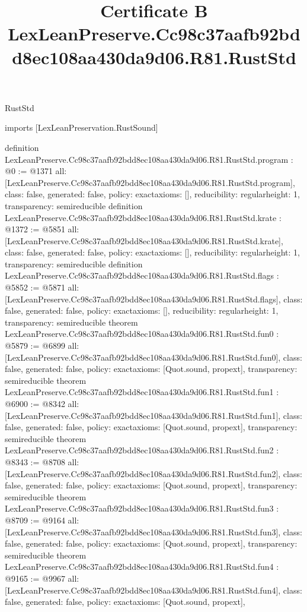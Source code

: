 \begin{lexlean}{RustStd}
\title{Certificate B LexLeanPreserve.Cc98c37aafb92bdd8ec108aa430da9d06.R81.RustStd}
\begin{coremodule}
imports [LexLeanPreservation.RustSound]

definition LexLeanPreserve.Cc98c37aafb92bdd8ec108aa430da9d06.R81.RustStd.program : @0 := @1371 {
  all: [LexLeanPreserve.Cc98c37aafb92bdd8ec108aa430da9d06.R81.RustStd.program],
  class: false,
  generated: false,
  policy: exact{axioms: []},
  reducibility: regular{height: 1},
  transparency: semireducible
}
definition LexLeanPreserve.Cc98c37aafb92bdd8ec108aa430da9d06.R81.RustStd.krate : @1372 := @5851 {
  all: [LexLeanPreserve.Cc98c37aafb92bdd8ec108aa430da9d06.R81.RustStd.krate],
  class: false,
  generated: false,
  policy: exact{axioms: []},
  reducibility: regular{height: 1},
  transparency: semireducible
}
definition LexLeanPreserve.Cc98c37aafb92bdd8ec108aa430da9d06.R81.RustStd.flags : @5852 := @5871 {
  all: [LexLeanPreserve.Cc98c37aafb92bdd8ec108aa430da9d06.R81.RustStd.flags],
  class: false,
  generated: false,
  policy: exact{axioms: []},
  reducibility: regular{height: 1},
  transparency: semireducible
}
theorem LexLeanPreserve.Cc98c37aafb92bdd8ec108aa430da9d06.R81.RustStd.fun0 : @5879 := @6899 {
  all: [LexLeanPreserve.Cc98c37aafb92bdd8ec108aa430da9d06.R81.RustStd.fun0],
  class: false,
  generated: false,
  policy: exact{axioms: [Quot.sound, propext]},
  transparency: semireducible
}
theorem LexLeanPreserve.Cc98c37aafb92bdd8ec108aa430da9d06.R81.RustStd.fun1 : @6900 := @8342 {
  all: [LexLeanPreserve.Cc98c37aafb92bdd8ec108aa430da9d06.R81.RustStd.fun1],
  class: false,
  generated: false,
  policy: exact{axioms: [Quot.sound, propext]},
  transparency: semireducible
}
theorem LexLeanPreserve.Cc98c37aafb92bdd8ec108aa430da9d06.R81.RustStd.fun2 : @8343 := @8708 {
  all: [LexLeanPreserve.Cc98c37aafb92bdd8ec108aa430da9d06.R81.RustStd.fun2],
  class: false,
  generated: false,
  policy: exact{axioms: [Quot.sound, propext]},
  transparency: semireducible
}
theorem LexLeanPreserve.Cc98c37aafb92bdd8ec108aa430da9d06.R81.RustStd.fun3 : @8709 := @9164 {
  all: [LexLeanPreserve.Cc98c37aafb92bdd8ec108aa430da9d06.R81.RustStd.fun3],
  class: false,
  generated: false,
  policy: exact{axioms: [Quot.sound, propext]},
  transparency: semireducible
}
theorem LexLeanPreserve.Cc98c37aafb92bdd8ec108aa430da9d06.R81.RustStd.fun4 : @9165 := @9967 {
  all: [LexLeanPreserve.Cc98c37aafb92bdd8ec108aa430da9d06.R81.RustStd.fun4],
  class: false,
  generated: false,
  policy: exact{axioms: [Quot.sound, propext]},
}
\end{coremodule}
\end{lexlean}

